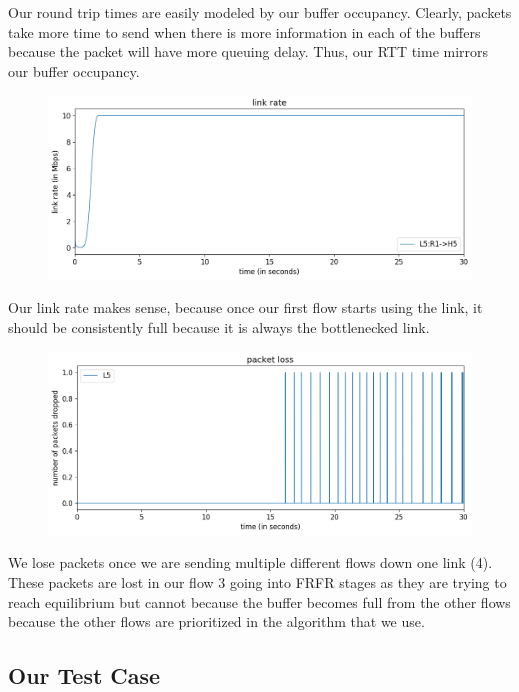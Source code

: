 \documentclass{article}
\begin{document}
Our round trip times are easily modeled by our buffer occupancy. Clearly, packets take more time to send when there is more information in each of the buffers because the packet will have more queuing delay. Thus, our RTT time mirrors our buffer occupancy.

\begin{figure}[H]
\centering
\includegraphics[width = \textwidth]{test_case5_fast link rate.png}
\end{figure}


Our link rate makes sense, because once our first flow starts using the link, it should be consistently full because it is always the bottlenecked link.

\begin{figure}[H]
\centering
\includegraphics[width = \textwidth]{test_case5_fast packet loss.png}
\end{figure}

We lose packets once we are sending multiple different flows down one link (4). These packets are lost in our flow 3 going into FRFR stages as they are trying to reach equilibrium but cannot because the buffer becomes full from the other flows because the other flows are prioritized in the algorithm that we use.


\subsection{Our Test Case}
\end{document}
